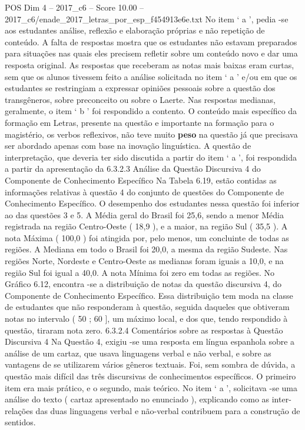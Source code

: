 \begin{textsample}{POS Dim 4 – 2017\_c6 – Score 10.00 – 2017\_c6/enade\_2017\_letras\_por\_esp\_f454913e6e.txt}
No item ‘ a ’, pedia -se aos estudantes análise, reflexão e elaboração próprias e não repetição de conteúdo.
A falta de respostas mostra que os estudantes não estavam preparados para situações nas quais eles precisem refletir sobre um conteúdo novo e dar uma resposta original.
As respostas que receberam as notas mais baixas eram curtas, sem que os alunos tivessem feito a análise solicitada no item ‘ a ’ e/ou em que os estudantes se restringiam a expressar opiniões pessoais sobre a questão dos transgêneros, sobre preconceito ou sobre o Laerte.
Nas respostas medianas, geralmente, o item ‘ b ’ foi respondido a contento.
O conteúdo mais específico da formação em Letras, presente na questão e importante na formação para o magistério, os verbos reflexivos, não teve muito \textbf{peso} na questão já que precisava ser abordado apenas com base na inovação linguística.
A questão de interpretação, que deveria ter sido discutida a partir do item ‘ a ’, foi respondida a partir da apresentação da 6.3.2.3 Análise da Questão Discursiva 4 do Componente de Conhecimento Específico Na Tabela 6.19, estão contidas as informações relativas à questão 4 do conjunto de questões do Componente de Conhecimento Específico.
O desempenho dos estudantes nessa questão foi inferior ao das questões 3 e 5.
A Média geral do Brasil foi 25,6, sendo a menor Média registrada na região Centro-Oeste ( 18,9 ), e a maior, na região Sul ( 35,5 ).
A nota Máxima ( 100,0 ) foi atingida por, pelo menos, um concluinte de todas as regiões.
A Mediana em todo o Brasil foi 20,0, a mesma da região Sudeste.
Nas regiões Norte, Nordeste e Centro-Oeste as medianas foram iguais a 10,0, e na região Sul foi igual a 40,0.
A nota Mínima foi zero em todas as regiões.
No Gráfico 6.12, encontra -se a distribuição de notas da questão discursiva 4, do Componente de Conhecimento Específico.
Essa distribuição tem moda na classe de estudantes que não responderam à questão, seguida daqueles que obtiveram notas no intervalo ( 50 ; 60 ], um máximo local, e dos que, tendo respondido à questão, tiraram nota zero. 6.3.2.4 Comentários sobre as respostas à Questão Discursiva 4 Na Questão 4, exigiu -se uma resposta em língua espanhola sobre a análise de um cartaz, que usava linguagens verbal e não verbal, e sobre as vantagens de se utilizarem vários gêneros textuais.
Foi, sem sombra de dúvida, a questão mais difícil das três discursivas de conhecimentos específicos.
O primeiro item era mais prático, e o segundo, mais teórico.
No item ‘ a ’, solicitava -se uma análise do texto ( cartaz apresentado no enunciado ), explicando como as inter-relações das duas linguagens verbal e não-verbal contribuem para a construção de sentidos.

\end{textsample}
